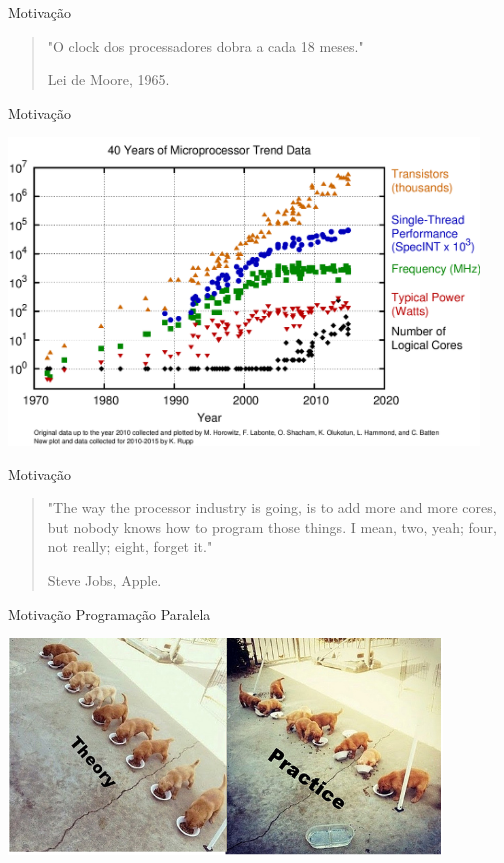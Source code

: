 \documentclass[aspectratio=169]{beamer}
\begin{document}
\begin{frame}{Motivação}
	\begin{quote}
		\hspace{0.5cm}"O clock dos processadores dobra a cada 18 meses."
		
		\hspace{8.2cm}Lei de Moore, 1965.
	\end{quote}
\end{frame}

\begin{frame}{Motivação}
	\begin{center}
		\includegraphics[width=12.5cm]{imgs/cores-history.png}
	\end{center}
\end{frame}

\begin{frame}{Motivação}
	\begin{quote}
		"The way the processor industry is going, is to add more and more cores, but nobody knows how to program those things. I mean, two, yeah; four, not really; eight, forget it."
		
		\hspace{8.2cm}Steve Jobs, Apple.
	\end{quote}
\end{frame}

\begin{frame}{Motivação}
	Programação Paralela
	\begin{center}
		\includegraphics[width=11.5cm]{imgs/meme.png}
	\end{center}
\end{frame}
\end{document}
